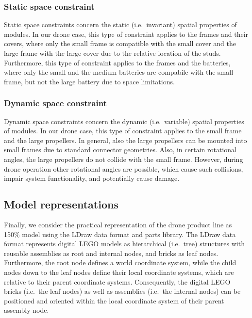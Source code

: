 \documentclass[sigconf,review]{acmart}
\begin{document}
\subsubsection*{Static space constraint}

Static space constraints concern the static (i.e.\ invariant) spatial properties of modules.
In our drone case, this type of constraint applies to the frames and their covers, where only the small frame is compatible with the small cover and the large frame with the large cover due to the relative location of the studs.
Furthermore, this type of constraint applies to the frames and the batteries, where only the small and the medium batteries are compabile with the small frame, but not the large battery due to space limitations.

\subsubsection*{Dynamic space constraint}

Dynamic space constraints concern the dynamic (i.e.\ variable) spatial properties of modules.
In our drone case, this type of constraint applies to the small frame and the large propellers.
In general, also the large propellers can be mounted into small frames due to standard connector geometries.
Also, in certain rotational angles, the large propellers do not collide with the small frame.
However, during drone operation other rotational angles are possible, which cause such collisions, impair system functionality, and potentially cause damage.

\subsection{Model representations}
\label{sec:150-model}

Finally, we consider the practical representation of the drone product line as 150\% model using the LDraw data format and parts library.
The LDraw data format represents digital LEGO models as hierarchical (i.e.\ tree) structures with reusable assemblies as root and internal nodes, and bricks as leaf nodes.
Furthermore, the root node defines a world coordinate system, while the child nodes down to the leaf nodes define their local coordinate systems, which are relative to their parent coordinate systems.
Consequently, the digital LEGO bricks (i.e.\ the leaf nodes) as well as assemblies (i.e.\ the internal nodes) can be positioned and oriented within the local coordinate system of their parent assembly node.
\end{document}
